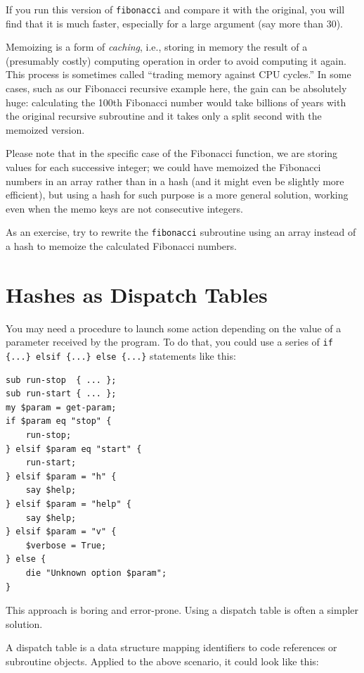 If you run this version of {\tt fibonacci} and compare it with
the original, you will find that it is much faster, especially 
for a large argument (say more than 30).

Memoizing is a form of \emph{caching}, i.e., storing in memory 
the result of a (presumably costly) computing operation in 
order to avoid computing it again. This process is 
sometimes called ``trading memory against CPU cycles.''  In 
some cases, such as our Fibonacci recursive example here, the gain 
can be absolutely huge: calculating the 100th Fibonacci 
number would take billions of years with the original recursive 
subroutine and it takes only a split second with the memoized 
version.

Please note that in the specific case of the Fibonacci function, 
we are storing values for each successive integer; we could 
have memoized the Fibonacci numbers in an array rather than 
in a hash (and it might even be slightly more efficient), but 
using a hash for such purpose is a more general solution, 
working even when the memo keys are not consecutive integers.

As an exercise, try to rewrite the {\tt fibonacci} subroutine 
using an array instead of a hash to memoize the calculated 
Fibonacci numbers.


\section{Hashes as Dispatch Tables}
\label{dispatch}

You may 
need a procedure to launch some action depending on the 
value of a parameter received by the program. To do that, 
you could use a series of 
\verb'if {...} elsif {...} else {...}' 
statements like this:

\begin{verbatim}
sub run-stop  { ... };
sub run-start { ... };
my $param = get-param;
if $param eq "stop" {
    run-stop;
} elsif $param eq "start" {
    run-start;
} elsif $param = "h" {
    say $help;
} elsif $param = "help" {
    say $help;
} elsif $param = "v" {
    $verbose = True;
} else {
    die "Unknown option $param";
}
\end{verbatim}

This approach is boring and error-prone. Using a dispatch table 
is often a simpler solution.

A dispatch table is a data structure mapping identifiers to 
code references or subroutine objects. Applied to the 
above scenario, it could look like this:

